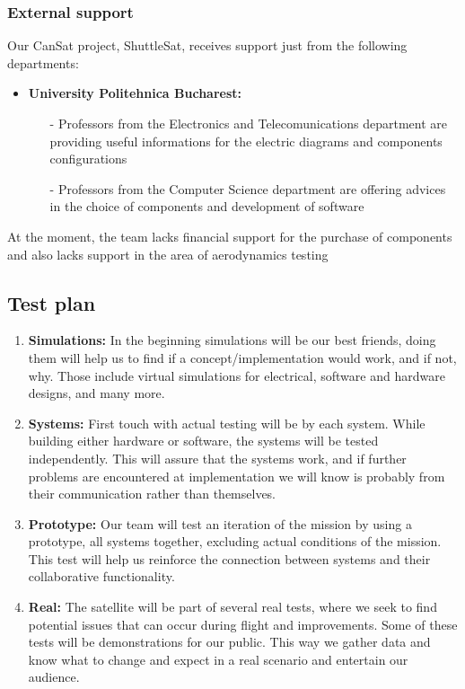 \documentclass[11pt]{article}
\begin{document}
\subsubsection{External support}
\hspace{0.5cm} Our CanSat project, ShuttleSat, receives support just from the following departments:
\begin{itemize}
\item \textbf{University Politehnica Bucharest:} 
\begin{itemize}
\item[-] Professors from the Electronics and Telecomunications department are providing useful informations for the electric diagrams and components configurations
\item[-] Professors from the Computer Science department are offering advices in the choice of components and development of software
\end{itemize}
\end{itemize}

At the moment, the team lacks financial support for the purchase of components and also lacks support in the area of aerodynamics testing

\subsection{Test plan}
\begin{enumerate}
    \item\textbf{Simulations:} {In the beginning simulations will be our best friends, doing them will help us to find if a concept/implementation would work, and if not, why. Those include virtual simulations for electrical, software and hardware designs, and many more.}
    \item\textbf{Systems:} {First touch with actual testing will be by each system. While building either hardware or software, the systems will be tested independently. This will assure that the systems work, and if further problems are encountered at implementation we will know is probably from their communication rather than themselves.}
    \item\textbf{Prototype:} {Our team will test an iteration of the mission by using a prototype, all systems together, excluding actual conditions of the mission. This test will help us reinforce the connection between systems and their collaborative functionality.}
    \item\textbf{Real:} {The satellite will be part of several real tests, where we seek to find potential issues that can occur during flight and improvements. Some of these tests will be demonstrations for our public. This way we gather data and know what to change and expect in a real scenario and entertain our audience.}
\end{enumerate}
\end{document}
